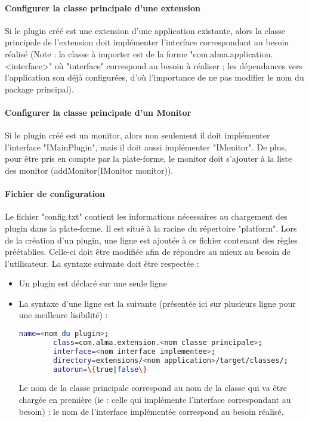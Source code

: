     \paragraph{Configurer la classe principale d'une extension} 
    Si le plugin créé est une extension d'une application existante, alors la classe principale de l'extension doit implémenter l'interface correspondant au besoin réalisé (Note : la classe à importer est de la forme "com.alma.application.<interface>" où "interface" correspond au besoin à réaliser ; les dépendances vers l'application son déjà configurées, d'où l'importance de ne pas modifier le nom du package principal).
    
    \paragraph{Configurer la classe principale d'un Monitor} 
    Si le plugin créé est un monitor, alors non seulement il doit implémenter l'interface "IMainPlugin", mais il doit aussi implémenter "IMonitor". De plus, pour être pris en compte par la plate-forme, le monitor doit s'ajouter à la liste des monitor (addMonitor(IMonitor monitor)).
    
    \paragraph{Fichier de configuration} Le fichier "config.txt" contient les informations nécessaires au chargement des plugin dans la plate-forme. Il est situé à la racine du répertoire "platform". Lors de la création d'un plugin, une ligne est ajoutée à ce fichier contenant des règles préétablies. Celle-ci doit être modifiée afin de répondre au mieux au besoin de l'utilisateur. La syntaxe suivante doit être respectée :
    
    \begin{itemize}
        \item Un plugin est déclaré sur une seule ligne
        
        \item La syntaxe d'une ligne est la suivante (présentée ici sur plusieurs ligne pour une meilleure lisibilité) :
        \begin{lstlisting}[language=Bash,extendedchars=true]
        name=<nom du plugin>;
        class=com.alma.extension.<nom classe principale>;
        interface=<nom interface implementee>;
        directory=extensions/<nom application>/target/classes/;
        autorun=\{true|false\}
        \end{lstlisting}
        Le nom de la classe principale correspond au nom de la classe qui va être chargée en première (ie : celle qui implémente l'interface correspondant au besoin) ; le nom de l'interface implémentée correspond au besoin réalisé.
    \end{itemize}
    
